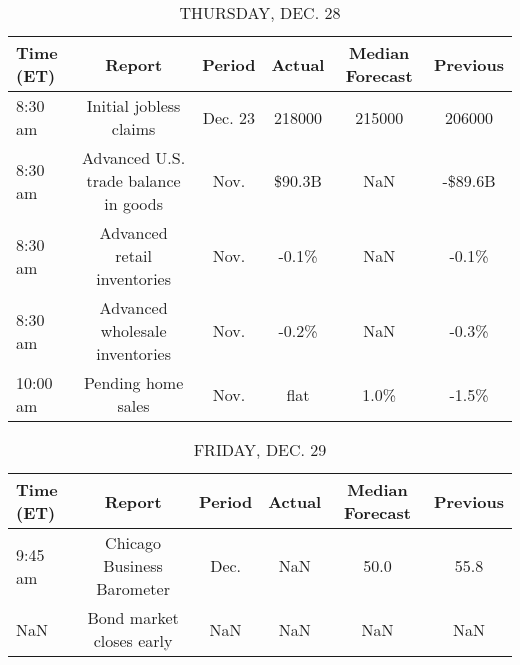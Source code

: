 \documentclass{article}%
\begin{document}
\begin{table}[htbp]%
\caption{THURSDAY, DEC. 28}%
\centering%
\begin{adjustbox}{width=1\textwidth}%
\begin{tabular}{lccccc}
\toprule
Time (ET) &                               Report &  Period & Actual & Median Forecast & Previous \\
\midrule
  8:30 am &               Initial jobless claims & Dec. 23 & 218000 &          215000 &   206000 \\
  8:30 am & Advanced U.S. trade balance in goods &    Nov. & \$90.3B &             NaN &  -\$89.6B \\
  8:30 am &          Advanced retail inventories &    Nov. &  -0.1\% &             NaN &    -0.1\% \\
  8:30 am &       Advanced wholesale inventories &    Nov. &  -0.2\% &             NaN &    -0.3\% \\
 10:00 am &                   Pending home sales &    Nov. &   flat &            1.0\% &    -1.5\% \\
\bottomrule
\end{tabular}
%
\end{adjustbox}%
\end{table}

%


\begin{table}[htbp]%
\caption{FRIDAY, DEC. 29}%
\centering%
\begin{adjustbox}{width=1\textwidth}%
\begin{tabular}{lccccc}
\toprule
Time (ET) &                     Report & Period & Actual & Median Forecast & Previous \\
\midrule
  9:45 am & Chicago Business Barometer &   Dec. &    NaN &            50.0 &     55.8 \\
      NaN &   Bond market closes early &    NaN &    NaN &             NaN &      NaN \\
\bottomrule
\end{tabular}
%
\end{adjustbox}%
\end{table}
\end{document}
